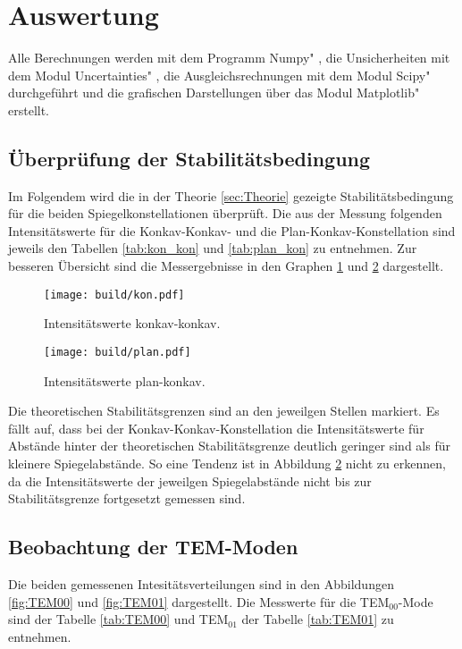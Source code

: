 \section{Auswertung}
\label{sec:Auswertung}
Alle Berechnungen werden mit dem Programm \glqq Numpy" \cite{numpy}, die Unsicherheiten mit dem Modul \glqq Uncertainties" \cite{uncertainties}, die Ausgleichsrechnungen mit dem Modul \glqq Scipy" \cite{scipy} durchgeführt und die grafischen Darstellungen über das Modul \glqq Matplotlib" \cite{matplotlib} erstellt.

\subsection{Überprüfung der Stabilitätsbedingung}

Im Folgendem wird die in der Theorie \ref{sec:Theorie} gezeigte Stabilitätsbedingung für die beiden Spiegelkonstellationen überprüft.
Die aus der Messung folgenden Intensitätswerte für die Konkav-Konkav- und die Plan-Konkav-Konstellation sind jeweils den Tabellen \ref{tab:kon_kon} und \ref{tab:plan_kon} zu entnehmen. 
Zur besseren Übersicht sind die Messergebnisse in den Graphen \ref{fig:kon} und \ref{fig:plan} dargestellt. 

\begin{figure}
    \centering
    \texttt{[image: build/kon.pdf]}
    \caption{Intensitätswerte konkav-konkav.}
    \label{fig:kon}
\end{figure}

\begin{figure}
    \centering
    \texttt{[image: build/plan.pdf]}
    \caption{Intensitätswerte plan-konkav.}
    \label{fig:plan}
\end{figure}

Die theoretischen Stabilitätsgrenzen sind an den jeweilgen Stellen markiert. 
Es fällt auf, dass bei der Konkav-Konkav-Konstellation die Intensitätswerte für Abstände hinter der theoretischen Stabilitätsgrenze deutlich geringer sind als für kleinere Spiegelabstände. 
So eine Tendenz ist in Abbildung \ref{fig:plan} nicht zu erkennen, da die Intensitätswerte der jeweilgen Spiegelabstände nicht bis zur Stabilitätsgrenze fortgesetzt gemessen sind. 


\subsection{Beobachtung der TEM-Moden}
 
Die beiden gemessenen Intesitätsverteilungen sind in den Abbildungen \ref{fig:TEM00} und \ref{fig:TEM01} dargestellt. Die Messwerte für die TEM$_{00}$-Mode sind der Tabelle \ref{tab:TEM00} und TEM$_{01}$ der Tabelle \ref{tab:TEM01} zu entnehmen.


